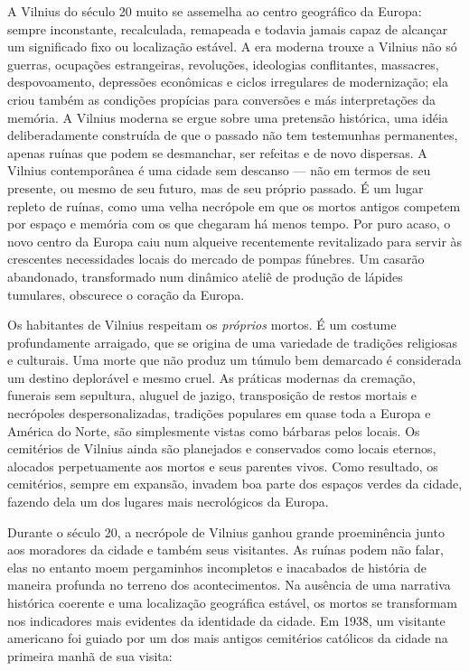 A Vilnius do século 20 muito se assemelha ao centro geográfico da
Europa: sempre inconstante, recalculada, remapeada e todavia jamais
capaz de alcançar um significado fixo ou localização estável. A era
moderna trouxe a Vilnius não só guerras, ocupações estrangeiras,
revoluções, ideologias conflitantes, massacres, despovoamento,
depressões econômicas e ciclos irregulares de modernização; ela criou
também as condições propícias para conversões e más interpretações da
memória. A Vilnius moderna se ergue sobre uma pretensão histórica, uma
idéia deliberadamente construída de que o passado não tem testemunhas
permanentes, apenas ruínas que podem se desmanchar, ser refeitas e de
novo dispersas. A Vilnius contemporânea é uma cidade sem descanso --- não
em termos de seu presente, ou mesmo de seu futuro, mas de seu próprio
passado. É um lugar repleto de ruínas, como uma velha necrópole em que
os mortos antigos competem por espaço e memória com os que chegaram há
menos tempo. Por puro acaso, o novo centro da Europa caiu num alqueive
recentemente revitalizado para servir às crescentes necessidades locais
do mercado de pompas fúnebres. Um casarão abandonado, transformado num
dinâmico ateliê de produção de lápides tumulares, obscurece o coração da
Europa.

Os habitantes de Vilnius respeitam os \emph{próprios} mortos. É um
costume profundamente arraigado, que se origina de uma variedade de
tradições religiosas e culturais. Uma morte que não produz um túmulo bem
demarcado é considerada um destino deplorável e mesmo cruel. As práticas
modernas da cremação, funerais sem sepultura, aluguel de jazigo,
transposição de restos mortais e necrópoles despersonalizadas, tradições
populares em quase toda a Europa e América do Norte, são simplesmente
vistas como bárbaras pelos locais. Os cemitérios de Vilnius ainda são
planejados e conservados como locais eternos, alocados perpetuamente aos
mortos e seus parentes vivos. Como resultado, os cemitérios, sempre em
expansão, invadem boa parte dos espaços verdes da cidade, fazendo dela
um dos lugares mais necrológicos da Europa.

Durante o século 20, a necrópole de Vilnius ganhou grande proeminência
junto aos moradores da cidade e também seus visitantes. As ruínas podem
não falar, elas no entanto moem pergaminhos incompletos e inacabados de
história de maneira profunda no terreno dos acontecimentos. Na ausência
de uma narrativa histórica coerente e uma localização geográfica
estável, os mortos se transformam nos indicadores mais evidentes da
identidade da cidade. Em 1938, um visitante americano foi guiado por um
dos mais antigos cemitérios católicos da cidade na primeira manhã de sua
visita:

